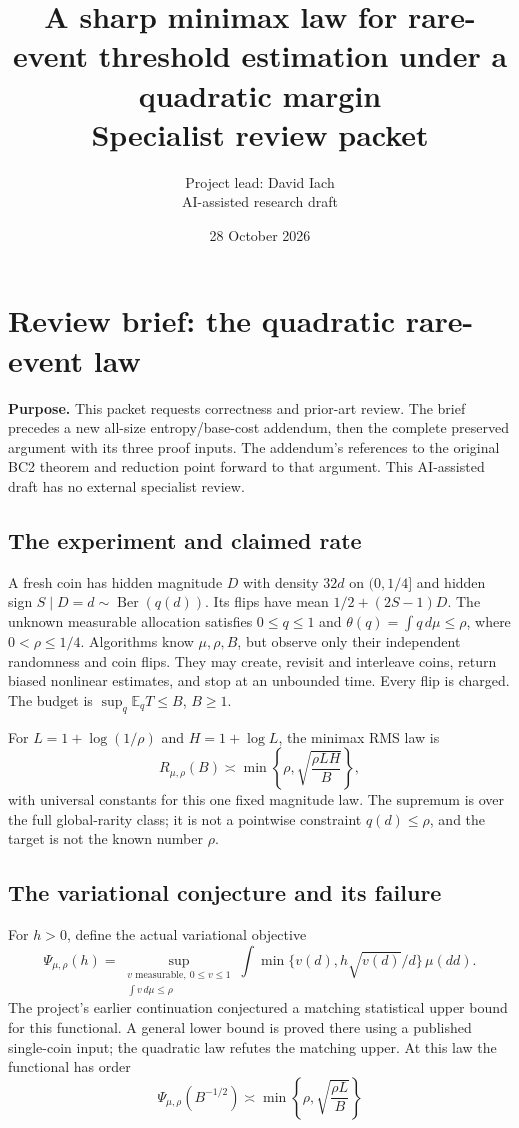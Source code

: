 \documentclass[11pt]{article}
\title{\textbf{A sharp minimax law for rare-event threshold estimation under a quadratic margin}\\[4pt]\large Specialist review packet}
\author{Project lead: David Iach\\\small AI-assisted research draft}
\date{28 October 2026}
\newcommand{\E}{\mathbb E}
\begin{document}
\maketitle
\section*{Review brief: the quadratic rare-event law}

\noindent\textbf{Purpose.} This packet requests correctness and prior-art review.
The brief precedes a new all-size entropy/base-cost addendum, then the complete
preserved argument with its three proof inputs. The addendum's references to
the original BC2 theorem and reduction point forward to that argument.
This AI-assisted draft has no external specialist review.

\subsection*{The experiment and claimed rate}
A fresh coin has hidden magnitude $D$ with density $32d$ on $(0,1/4]$ and
hidden sign $S\mid D=d\sim\operatorname{Ber}(q(d))$. Its flips have mean
$1/2+(2S-1)D$. The unknown measurable allocation satisfies
$0\le q\le1$ and $\theta(q)=\int q\,d\mu\le\rho$, where $0<\rho\le1/4$.
Algorithms know $\mu,\rho,B$, but observe only their independent randomness
and coin flips. They may create, revisit and interleave coins, return biased
nonlinear estimates, and stop at an unbounded time. Every flip is charged.
The budget is $\sup_q\E_qT\le B$, $B\ge1$.

For $L=1+\log(1/\rho)$ and $H=1+\log L$, the minimax RMS law is
\[
 R_{\mu,\rho}(B)\asymp
 \min\left\{\rho,\sqrt{\frac{\rho LH}{B}}\right\},
\]
with universal constants for this one fixed magnitude law. The supremum is
over the full global-rarity class; it is not a pointwise constraint
$q(d)\le\rho$, and the target is not the known number $\rho$.

\subsection*{The variational conjecture and its failure}
For $h>0$, define the actual variational objective
\[
 \Psi_{\mu,\rho}(h)=
 \sup_{\substack{v\text{ measurable},\ 0\le v\le1\\\int v\,d\mu\le\rho}}
 \int\min\{v(d),h\sqrt{v(d)}/d\}\,\mu(dd).
\]
The project's earlier continuation conjectured a matching statistical upper
bound for this functional. A general lower bound is proved there using a
published single-coin input; the quadratic law refutes the matching upper.
At this law the functional has order
\[
 \Psi_{\mu,\rho}(B^{-1/2})\asymp
 \min\left\{\rho,\sqrt{\frac{\rho L}{B}}\right\}
\]
\clearpage
\end{document}
